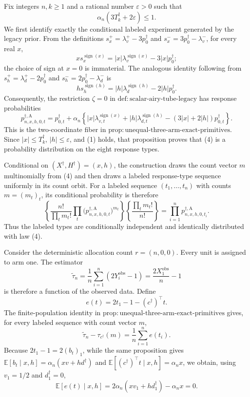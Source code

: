 Fix integers \(n,k\geq 1\) and a rational number \(\varepsilon>0\) such that
\[
\alpha_n(3T_k^\dagger+2\varepsilon)\leq 1.
\tag{1}
\]
We first identify exactly the conditional labeled experiment generated by the legacy prior.  From the definitions
\(s_x^+=\lambda_v^+-3p_0^\dagger\) and
\(s_x^-=3p_0^\dagger-\lambda_v^-\), for every real \(x\),
\[
x s_x^{\operatorname{sign}(x)}
=|x|\lambda_v^{\operatorname{sign}(x)}-3|x|p_0^\dagger;
\tag{2}
\]
the choice of sign at \(x=0\) is immaterial.  The analogous identity following from
\(s_h^+=\lambda_d^+-2p_0^\dagger\) and
\(s_h^-=2p_0^\dagger-\lambda_d^-\) is
\[
h s_h^{\operatorname{sign}(h)}
=|h|\lambda_d^{\operatorname{sign}(h)}-2|h|p_0^\dagger.
\tag{3}
\]
Consequently, the restriction \(\zeta=0\) in
\(\mathrm{def:scalar\text{-}airy\text{-}tube\text{-}legacy}\) has response probabilities
\[
p_{n,x,h,0,t}^{\dagger,\mathrm A}
=p_{0,t}^\dagger+
\alpha_n\left\{|x|\lambda_{v,t}^{\operatorname{sign}(x)}
+|h|\lambda_{d,t}^{\operatorname{sign}(h)}
-(3|x|+2|h|)p_{0,t}^\dagger\right\}.
\tag{4}
\]
This is the two-coordinate fiber in
\(\mathrm{prop:unequal\text{-}three\text{-}arm\text{-}exact\text{-}primitives}\).  Since
\(|x|\leq T_k^\dagger\), \(|h|\leq\varepsilon\), and (1) holds, that proposition proves that (4) is a probability distribution on the eight response types.

Conditional on \((X^\dagger,H^\dagger)=(x,h)\), the construction draws the count vector \(m\) multinomially from (4) and then draws a labeled response-type sequence uniformly in its count orbit.  For a labeled sequence \((t_1,\ldots,t_n)\) with counts \(m=(m_t)_t\), its conditional probability is therefore
\[
\left\{\frac{n!}{\prod_t m_t!}
\prod_t\bigl(p_{n,x,h,0,t}^{\dagger,\mathrm A}\bigr)^{m_t}\right\}
\left\{\frac{\prod_t m_t!}{n!}\right\}
=\prod_{i=1}^n p_{n,x,h,0,t_i}^{\dagger,\mathrm A}.
\tag{5}
\]
Thus the labeled types are conditionally independent and identically distributed with law (4).

Consider the deterministic allocation count \(r=(n,0,0)\).  Every unit is assigned to arm one.  The estimator
\[
\widetilde\tau_n
=\frac1n\sum_{i=1}^n(2Y_i^{\mathrm{obs}}-1)
=\frac{2X_1^{\mathrm{obs}}}{n}-1
\tag{6}
\]
is therefore a function of the observed data.  Define
\[
e(t)=2t_1-1-(c^\dagger)^\top t.
\tag{7}
\]
The finite-population identity in
\(\mathrm{prop:unequal\text{-}three\text{-}arm\text{-}exact\text{-}primitives}\) gives, for every labeled sequence with count vector \(m\),
\[
\widetilde\tau_n-\tau_{c^\dagger}(m)
=\frac1n\sum_{i=1}^n e(t_i).
\tag{8}
\]
Because \(2t_1-1=2(b_t)_1\), while the same proposition gives
\(\mathbb E[b_t\mid x,h]=\alpha_n(xv+hd^\dagger)\) and
\(\mathbb E[(c^\dagger)^\top t\mid x,h]=\alpha_nx\), we obtain, using
\(v_1=1/2\) and \(d_1^\dagger=0\),
\[
\mathbb E[e(t)\mid x,h]
=2\alpha_n(xv_1+hd_1^\dagger)-\alpha_nx=0.
\tag{9}
\]

